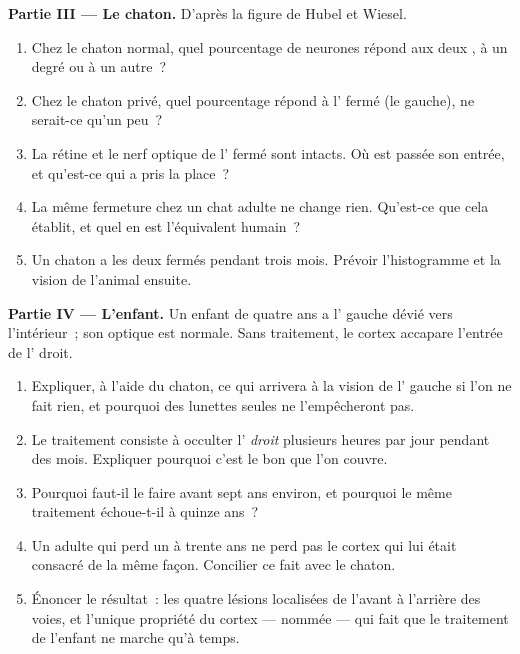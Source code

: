 \begin{problem}
\medskip
\noindent\textbf{Partie III --- Le chaton.}
D'après la figure de Hubel et Wiesel.
\begin{enumerate}[resume]
  \item Chez le chaton normal, quel pourcentage de neurones répond aux
        deux , à un degré ou à un autre~?
  \item Chez le chaton privé, quel pourcentage répond à l' fermé
        (le gauche), ne serait-ce qu'un peu~?
  \item La rétine et le nerf optique de l' fermé sont intacts. Où
        est passée son entrée, et qu'est-ce qui a pris la place~?
  \item La même fermeture chez un chat adulte ne change rien.
        Qu'est-ce que cela établit, et quel en est l'équivalent
        humain~?
  \item Un chaton a les deux  fermés pendant trois mois. Prévoir
        l'histogramme et la vision de l'animal ensuite.
\end{enumerate}

\medskip
\noindent\textbf{Partie IV --- L'enfant.}
Un enfant de quatre ans a l' gauche dévié vers l'intérieur~; son
optique est normale. Sans traitement, le cortex accapare l'entrée de
l' droit.
\begin{enumerate}[resume]
  \item Expliquer, à l'aide du chaton, ce qui arrivera à la vision de
        l' gauche si l'on ne fait rien, et pourquoi des lunettes
        seules ne l'empêcheront pas.
  \item Le traitement consiste à occulter l' \emph{droit} plusieurs
        heures par jour pendant des mois. Expliquer pourquoi c'est le
        bon  que l'on couvre.
  \item Pourquoi faut-il le faire avant sept ans environ, et pourquoi
        le même traitement échoue-t-il à quinze ans~?
  \item Un adulte qui perd un  à trente ans ne perd pas le cortex
        qui lui était consacré de la même façon. Concilier ce fait avec
        le chaton.
  \item Énoncer le résultat~: les quatre lésions localisées de l'avant
        à l'arrière des voies, et l'unique propriété du cortex ---
        nommée --- qui fait que le traitement de l'enfant ne marche
        qu'à temps.
\end{enumerate}
\end{problem}
